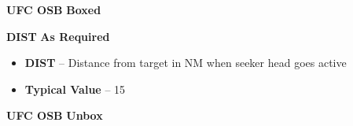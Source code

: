 \documentclass[fontInter]{TechCheck}
\begin{document}
\begin{checklistenumerate}
{\begin{subenumerate}
			\item \textbf{UFC OSB} \dotfill \textbf{Boxed}
			\item \textbf{DIST} \dotfill \textbf{As Required}
			\begin{itemize}
				\item \textbf{DIST} -- Distance from target in NM when seeker head goes active
				\item \textbf{Typical Value} -- 15
			\end{itemize}
			\item \textbf{UFC OSB} \dotfill \textbf{Unbox}
		\end{subenumerate}}
	\end{checklistenumerate}

	\clearpage
\end{document}
